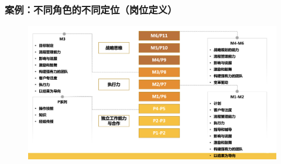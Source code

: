 \documentclass[12pt]{article}
\begin{document}
\subsubsection{案例：不同角色的不同定位（岗位定义）}
\begin{figure}[H]
    \centering
    \includegraphics[width=1\textwidth]{fig/Ali_Performance_15.png}
\end{figure}





\end{document}

